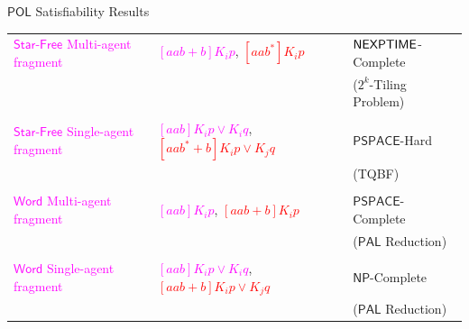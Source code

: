 \documentclass[usenames,dvipsnames]{beamer}
\newcommand{\POL}{\mathsf{POL}}
\newcommand{\starfree}{\mathsf{Star\mbox{-}Free}}
\newcommand{\word}{\mathsf{Word}}
\newcommand{\PSPACE}{\mathsf{PSPACE}}
\newcommand{\NP}{\mathsf{NP}}
\begin{document}
\newcommand{\PAL}{\mathsf{PAL}}
\begin{frame}{$\POL$ Satisfiability Results}
    \begin{center}
        \begin{tabular}{ m{9em} m{4cm} m{3cm} } 
         \textcolor{Fuchsia}{\textbf{$\starfree$} Multi-agent fragment} & \textcolor{Fuchsia}{$[aab+b]K_i p$}, \textcolor{Red}{\st{$[aab^*]K_i p$}} & $\mathsf{NEXPTIME}$-Complete \\
         & & ($2^k$-Tiling Problem)\\
         & &\\
         \textcolor{Fuchsia}{\textbf{$\starfree$} Single-agent fragment} & \textcolor{Fuchsia}{$[aab]K_i p\vee K_i q$}, \textcolor{Red}{\st{$[aab^*+b]K_i p\vee K_j q$}} & $\PSPACE$-Hard \\ 
         & & (TQBF)\\
         & &\\
         \textcolor{Fuchsia}{$\word$ Multi-agent fragment} & \textcolor{Fuchsia}{$[aab]K_i p$}, \textcolor{Red}{\st{$[aab+b]K_i p$}} & $\PSPACE$-Complete\\
         & & ($\PAL$ Reduction)\\
         & &\\
         \textcolor{Fuchsia}{$\word$ Single-agent fragment} & \textcolor{Fuchsia}{$[aab]K_i p\vee K_i q$}, \textcolor{Red}{\st{$[aab+b]K_i p\vee K_j q$}} & $\NP$-Complete\\
         & & ($\PAL$ Reduction)
        \end{tabular}
    \end{center}
\end{frame}





\end{document}
